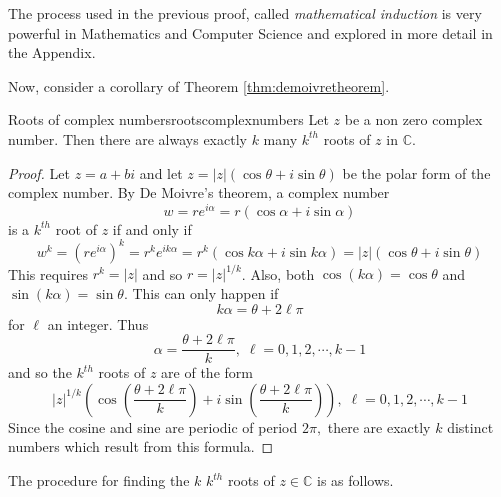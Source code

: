 The process used in the previous proof, called {\em mathematical
induction\em} is very powerful in Mathematics and Computer Science
and explored in more detail in the Appendix.

Now, consider a corollary of Theorem \ref{thm:demoivretheorem}.

\begin{corollary}{Roots of complex numbers}{rootscomplexnumbers}
Let $z$ be a non zero complex number.
Then there are always exactly $k$ many  $k^{th}$
roots of $z$ in $\mathbb{C}$.
\end{corollary}

\begin{proof}
Let $z=a+bi$ and let $z=\left\vert z\right\vert \left( \cos
\theta+i\sin \theta\right) $ be the polar form of the complex number. By De Moivre's
theorem, a complex number
\begin{equation*}
w= r e^{i \alpha} = r\left( \cos \alpha +i\sin \alpha \right) 
\end{equation*}
is a $k^{th}$ root of $z$ if and only if
\begin{equation*}
w^k = (r e^{i \alpha})^k = r^k e^{ik\alpha} = r^{k}\left( \cos k\alpha +i\sin k\alpha \right) =\left\vert z\right\vert
\left( \cos \theta+i\sin \theta\right) 
\end{equation*}
This requires $r^{k}=\left\vert z\right\vert $ and so $r=\left\vert
z\right\vert ^{1/k}$. Also, both $\cos \left( k\alpha \right) =\cos \theta$ and
$\sin \left( k\alpha \right) =\sin \theta.$ This can only happen if
\begin{equation*}
k\alpha =\theta+2 \ell \pi
\end{equation*}
for $\ell$ an integer. Thus
\begin{equation*}
\alpha =
\frac{\theta+2 \ell \pi }{k},\; \ell = 0, 1, 2, \cdots, k-1 
\end{equation*}
and so the $k^{th}$ roots of $z$ are of the form
\begin{equation*}
\left\vert z\right\vert ^{1/k}\left( \cos \left( \frac{\theta+2 \ell \pi }{k}\right)
+i\sin \left( \frac{\theta+2 \ell \pi }{k}\right) \right) ,\;\ell = 0, 1, 2, \cdots, k-1 
\end{equation*}
Since the cosine and sine are periodic of period $2\pi ,$ there are exactly $
k$ distinct numbers which result from this formula. 
\end{proof}

The procedure for finding the $k$ $k^{th}$ roots of $z \in \mathbb{C}$ is as follows.

